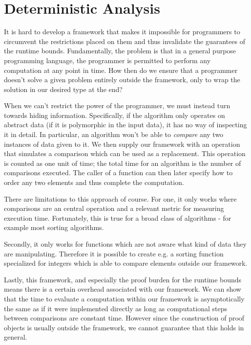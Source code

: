 
\chapter{Deterministic Analysis}
\label{ch:detanalysis}
It is hard to develop a framework that makes it impossible for programmers to circumvent the restrictions placed on them and thus invalidate the guarantees of the runtime bounds. Fundamentally, the problem is that in a general purpose programming language, the programmer is permitted to perform any computation at any point in time. How then do we ensure that a programmer doesn't solve a given problem entirely outside the framework, only to wrap the solution in our desired type at the end?

When we can't restrict the power of the programmer, we must instead turn towards hiding information. Specifically, if the algorithm only operates on abstract data (if it is polymorphic in the input data), it has no way of inspecting it in detail. In particular, an algorithm won't be able to \emph{compare} any two instances of data given to it. We then supply our framework with an operation that simulates a comparison which can be used as a replacement. This operation is counted as one unit of time; the total time for an algorithm is the number of comparisons executed. The caller of a function can then later specify how to order any two elements and thus complete the computation.

There are limitations to this approach of course. For one, it only works where comparisons are an central operation and a relevant metric for measuring execution time. Fortunately, this is true for a broad class of algorithms - for example most sorting algorithms.

Secondly, it only works for functions which are not aware what kind of data they are manipulating. Therefore it is possible to create e.g. a sorting function specialized for integers which is able to compare elements outside our framework.

Lastly, this framework, and especially the proof burden for the runtime bounds means there is a certain overhead associated with our framework. We can show that the time to evaluate a computation within our framework is asymptotically the same as if it were implemented directly as long as computational steps between comparisons are constant time. However since the construction of proof objects is usually outside the framework, we cannot guarantee that this holds in general.

